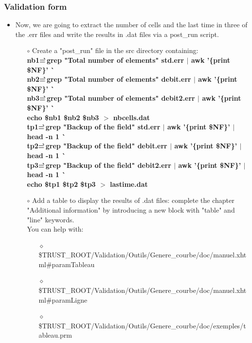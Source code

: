 \documentclass[10pt, hyperref={unicode=true,pdfusetitle, bookmarks=true,bookmarksnumbered=false,bookmarksopen=false, breaklinks=false,pdfborder={0 0 1},backref=true,colorlinks=true,linkcolor=darkblue,pageanchor}]{beamer}
\begin{document}
\begin{frame}
\frametitle{Validation form}
\begin{block}{}

\begin{itemize}
\item Now, we are going to extract the number of cells and the last time in three of the .err files and write the results in .dat files via a post\_run script.

    \begin{itemize}
    \item [$\circ$] Create a "post\_run" file in the src directory containing:\\
    {\footnotesize{
    \textbf{nb1=\` \,grep "Total number of elements" std.err $|$ awk '\{print \$NF\}' \`} \\
    \textbf{nb2=\` \,grep "Total number of elements" debit.err $|$ awk '\{print \$NF\}' \`} \\
    \textbf{nb3=\` \,grep "Total number of elements" debit2.err $|$ awk '\{print \$NF\}' \`} \\
    \textbf{echo \$nb1 \$nb2 \$nb3 $>$ nbcells.dat} \\
    \textbf{tp1=\` \,grep "Backup of the field" std.err $|$ awk '\{print \$NF\}' $|$ head -n 1 \`} \\
    \textbf{tp2=\` \,grep "Backup of the field" debit.err $|$ awk '\{print \$NF\}' $|$ head -n 1 \`} \\
    \textbf{tp3=\` \,grep "Backup of the field" debit2.err $|$ awk '\{print \$NF\}' $|$ head -n 1 \`} \\
    \textbf{echo \$tp1 \$tp2 \$tp3 $>$ lastime.dat} \\
    }}

    \item [$\circ$] Add a table to display the results of .dat files: complete the chapter "Additional information" by introducing a new block with "table" and "line" keywords.\\
    You can help with:
        \begin{itemize}
        \item [$\diamond$] {\scriptsize{\$TRUST\_ROOT/Validation/Outils/Genere\_courbe/doc/manuel.xhtml\#paramTableau}}
        \item [$\diamond$] {\scriptsize{\$TRUST\_ROOT/Validation/Outils/Genere\_courbe/doc/manuel.xhtml\#paramLigne}}
        \item [$\diamond$] {\scriptsize{\$TRUST\_ROOT/Validation/Outils/Genere\_courbe/doc/exemples/tableau.prm}}
        \end{itemize}
    \end{itemize}
\end{itemize}

\end{block}
\end{frame}
\end{document}
